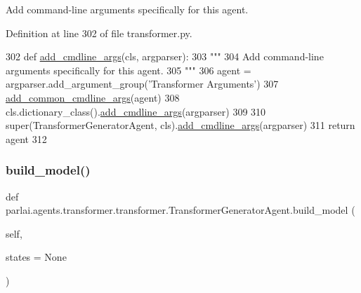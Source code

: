 \begin{DoxyVerb}Add command-line arguments specifically for this agent.
\end{DoxyVerb}
 

Definition at line 302 of file transformer.\+py.


\begin{DoxyCode}
302     \textcolor{keyword}{def }\hyperlink{namespaceparlai_1_1agents_1_1drqa_1_1config_a62fdd5554f1da6be0cba185271058320}{add\_cmdline\_args}(cls, argparser):
303         \textcolor{stringliteral}{"""}
304 \textcolor{stringliteral}{        Add command-line arguments specifically for this agent.}
305 \textcolor{stringliteral}{        """}
306         agent = argparser.add\_argument\_group(\textcolor{stringliteral}{'Transformer Arguments'})
307         \hyperlink{namespaceparlai_1_1agents_1_1transformer_1_1transformer_a916bc49d43dc0e244d24c47956c621ca}{add\_common\_cmdline\_args}(agent)
308         cls.dictionary\_class().\hyperlink{namespaceparlai_1_1agents_1_1drqa_1_1config_a62fdd5554f1da6be0cba185271058320}{add\_cmdline\_args}(argparser)
309 
310         super(TransformerGeneratorAgent, cls).\hyperlink{namespaceparlai_1_1agents_1_1drqa_1_1config_a62fdd5554f1da6be0cba185271058320}{add\_cmdline\_args}(argparser)
311         \textcolor{keywordflow}{return} agent
312 
\end{DoxyCode}
\mbox{\label{classparlai_1_1agents_1_1transformer_1_1transformer_1_1TransformerGeneratorAgent_a473f2a19d6bce412c4c9163c7beb9b09}} 
\subsubsection{\texorpdfstring{build\+\_\+model()}{build\_model()}}
{\footnotesize\ttfamily def parlai.\+agents.\+transformer.\+transformer.\+Transformer\+Generator\+Agent.\+build\+\_\+model (\begin{DoxyParamCaption}\item[{}]{self,  }\item[{}]{states = {\ttfamily None} }\end{DoxyParamCaption})}

